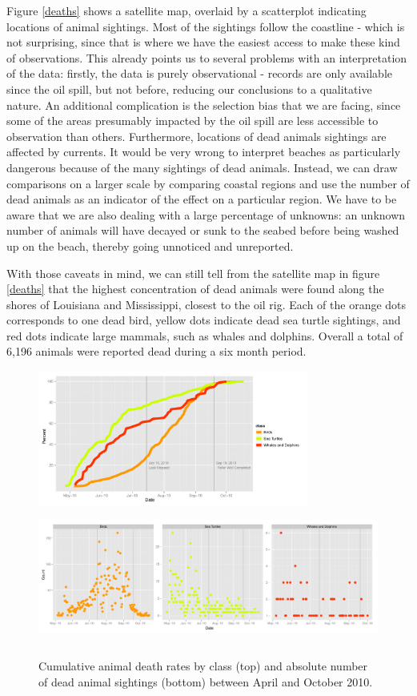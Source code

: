 \documentclass[authoryear,12pt]{elsarticle}
\begin{document}
Figure \ref{deaths} shows a satellite map, overlaid by a scatterplot indicating locations of animal sightings. Most of the sightings follow the coastline - which is not surprising, since that is where we have the easiest access to make these kind of observations. This already points us to several problems with an interpretation of the data:
firstly, the data is purely observational - records are only available since the oil spill, but not before, reducing our conclusions to a qualitative nature. An additional  complication is the selection bias that we are facing, since some of the areas presumably impacted by the oil spill are less accessible to observation than others. Furthermore, locations of dead animals sightings are affected by  currents. It would be very wrong to interpret beaches as particularly dangerous because of the many sightings of dead animals. Instead, we can draw comparisons on a larger scale by comparing coastal regions and use  the number  of dead animals as an indicator of the effect on a particular region.  We have to be aware that we are also dealing with a large percentage of unknowns: an unknown number of animals will have decayed or sunk to the seabed before being washed up on the beach, thereby going unnoticed and unreported.

With those caveats in mind, we can still tell from the satellite map in figure \ref{deaths} that the highest concentration of dead animals were found along the shores of Louisiana and Mississippi, closest to the oil rig. Each of the orange dots corresponds to one dead bird, yellow dots indicate dead sea turtle sightings, and red dots indicate large mammals, such as whales and dolphins. Overall a total of 6,196 animals were reported dead during a six month period.

\begin{figure}[htbp] %
   \centering
   \includegraphics[height=1.75in]{death-rates.pdf} 
    \includegraphics[height=1.75in]{daily-death-counts.pdf}
   \caption{Cumulative animal death rates by class  (top) and absolute number of dead animal sightings (bottom) between April and October 2010.\newline}
   \label{death rates}
\end{figure}
\end{document}
